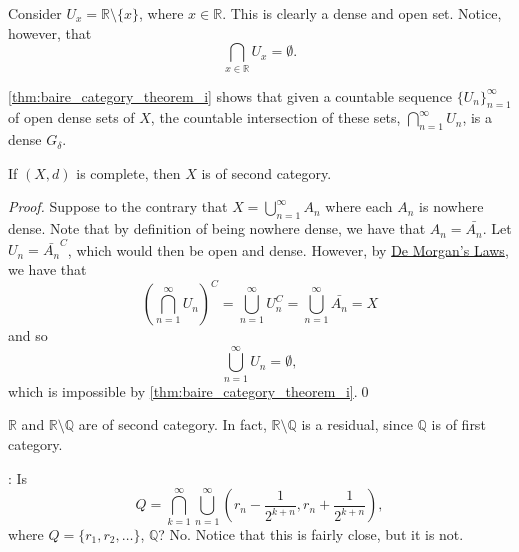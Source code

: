\documentclass[notoc,notitlepage]{tufte-book}
\begin{document}
\begin{eg}
  Consider $U_x = \mathbb{R} \setminus \{ x \}$, where $x \in \mathbb{R}$. This is clearly a dense and open set. Notice, however, that
  \begin{equation*}
    \bigcap_{x \in \mathbb{R}} U_x = \emptyset.
  \end{equation*}
\end{eg}

\begin{remark}
  \cref{thm:baire_category_theorem_i} shows that given a countable sequence $\{ U_n \}_{n = 1}^{\infty}$ of open dense sets of $X$, the countable intersection of these sets, $\bigcap_{n=1}^{\infty} U_n$, is a dense $G_\delta$.
\end{remark}

\begin{thm}\label{thm:baire_category_theorem_ii}
  If $(X, d)$ is complete, then $X$ is of second category.
\end{thm}

\begin{proof}
  Suppose to the contrary that $X = \bigcup_{n=1}^{\infty} A_n$ where each $A_n$ is nowhere dense. Note that by definition of being nowhere dense, we have that $A_n = \bar{A_n}$. Let $U_n = \bar{A_n}^C$, which would then be open and dense. However, by \hyperref[thm:de_morgan_s_laws]{De Morgan's Laws}, we have that
  \begin{equation*}
    \left( \bigcap_{n=1}^{\infty} U_n \right)^C = \bigcup_{n=1}^{\infty} U_n^C = \bigcup_{n=1}^{\infty} \bar{A_n} = X
  \end{equation*}
  and so
  \begin{equation*}
    \bigcup_{n=1}^{\infty} U_n = \emptyset,
  \end{equation*}
  which is impossible by \cref{thm:baire_category_theorem_i}.\qed\
\end{proof}

\begin{eg}
  $\mathbb{R}$ and $\mathbb{R} \setminus \mathbb{Q}$ are of second category. In fact, $\mathbb{R} \setminus \mathbb{Q}$ is a residual, since $\mathbb{Q}$ is of first category.
\end{eg}

: Is
\begin{equation*}
  Q = \bigcap_{k=1}^{\infty} \bigcup_{n=1}^{\infty} \left( r_n - \frac{1}{2^{k + n}}, r_n + \frac{1}{2^{k + n}} \right),
\end{equation*}
where $Q = \{ r_1, r_2, \ldots \}$, $\mathbb{Q}$? No. Notice that this is fairly close, but it is not.
\end{document}
